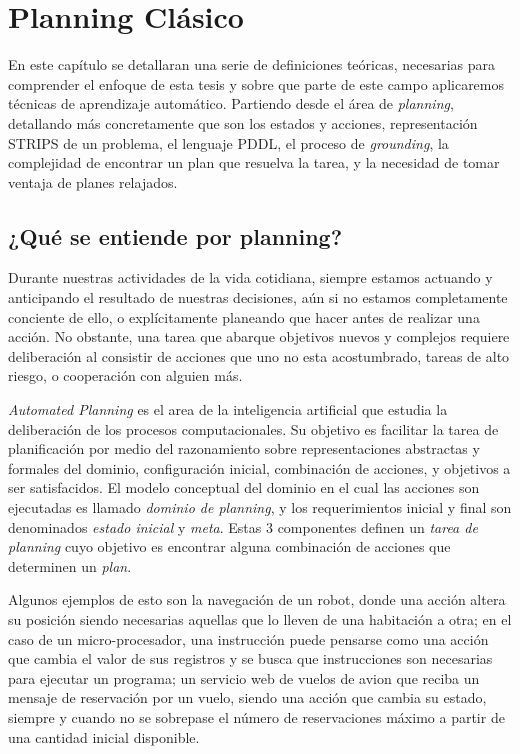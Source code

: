 \chapter{Planning Clásico}
\label{ch:lit_rev}

En este capítulo se detallaran una serie de definiciones teóricas, necesarias
para comprender el enfoque de esta tesis y sobre que parte de este campo
aplicaremos técnicas de aprendizaje automático. Partiendo desde el área de
\emph{planning}, detallando más concretamente que son los estados y acciones,
representación STRIPS de un problema, el lenguaje PDDL, el proceso de
\emph{grounding}, la complejidad de encontrar un plan que resuelva la tarea, y
la necesidad de tomar ventaja de planes relajados.

\section{¿Qué se entiende por planning?}

Durante nuestras actividades de la vida cotidiana, siempre estamos actuando y
anticipando el resultado de nuestras decisiones, aún si no estamos completamente
conciente de ello, o explícitamente planeando que hacer antes de realizar una
acción. No obstante, una tarea que abarque objetivos nuevos y complejos requiere
deliberación al consistir de acciones que uno no esta acostumbrado, tareas de
alto riesgo, o cooperación con alguien más.

\emph{Automated Planning} es el area de la inteligencia artificial que estudia
la deliberación de los procesos computacionales. Su objetivo es facilitar la
tarea de planificación por medio del razonamiento sobre representaciones
abstractas y formales del dominio, configuración inicial, combinación de
acciones, y objetivos a ser satisfacidos. El modelo conceptual del dominio en el
cual las acciones son ejecutadas es llamado \emph{dominio de planning}, y los
requerimientos inicial y final son denominados \emph{estado inicial} y
\emph{meta}. Estas 3 componentes definen un \emph{tarea de planning} cuyo
objetivo es encontrar alguna combinación de acciones que determinen un
\emph{plan}.

Algunos ejemplos de esto son la navegación de un robot, donde una acción altera
su posición siendo necesarias aquellas que lo lleven de una habitación a otra;
en el caso de un micro-procesador, una instrucción puede pensarse como una
acción que cambia el valor de sus registros y se busca que instrucciones son
necesarias para ejecutar un programa; un servicio web de vuelos de avion que
reciba un mensaje de reservación por un vuelo, siendo una acción que cambia su
estado, siempre y cuando no se sobrepase el número de reservaciones máximo a
partir de una cantidad inicial disponible. \citep{Sandewall-2008-HandbookOK}

